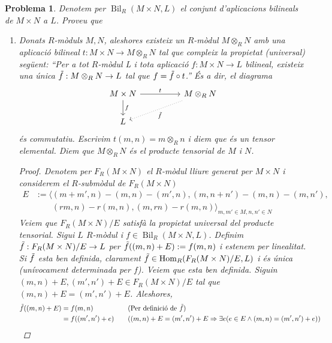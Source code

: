 \documentclass[compress]{article}
\newtheorem{problema}{Problema}
\theoremstyle{definition}
\DeclareMathOperator{\Hom}{Hom}
\DeclareMathOperator{\Bil}{Bil}
\begin{document}
\begin{problema}
    Denotem per $\Bil_{R}(M\times N,L)$ el conjunt d'aplicacions bilineals de $M\times N$ a $L$. Proveu que
    \begin{enumerate}
        \item Donats $R$-mòduls $M,N$, aleshores existeix un $R$-mòdul $M\otimes_{R}N$ amb una aplicació bilineal $t:M\times N\rightarrow M\otimes_{R}N$ tal que compleix la propietat (universal) següent: “Per a tot $R$-mòdul L i tota aplicació $f:M\times N\rightarrow L$ bilineal, existeix una única $\Tilde{f}:M\otimes_{R}N\rightarrow L$ tal que $f=\Tilde{f}\circ t$.” És a dir, el diagrama
        \begin{equation*}
        \begin{tikzcd}
            M\times N
            \arrow{rr}{t}
            \arrow{d}{f}
            &&M\otimes_{R}N
            \arrow[dotted]{dll}{\Tilde{f}}\\
            L
        \end{tikzcd}
        \end{equation*}
        és commutatiu. Escrivim $t(m,n)=m\otimes_{R}n$ i diem que és un tensor elemental. Diem que $M\otimes_{R}N$ és el producte tensorial de $M$ i $N$.
        \begin{proof}
            Denotem per $F_{R}(M\times N)$ el $R$-mòdul lliure generat per $M\times N$ i considerem el $R$-submòdul de $F_{R}(M\times N)$
            \begin{align*}
                E&:=\langle(m+m',n)-(m,n)-(m',n),(m,n+n')-(m,n)-(m,n'),\\
                &\,\,\,\,\,\,\,\,\,\,\,\,(rm,n)-r(m,n),(m,rn)-r(m,n)\rangle_{m,m'\in M,n,n'\in N}
            \end{align*}
            Veiem que $F_{R}(M\times N)/E$ satisfà la propietat universal del producte tensorial. Sigui $L$ $R$-mòdul i $f\in\Bil_{R}(M\times N,L)$. Definim $\Tilde{f}:F_{R}(M\times N)/E\rightarrow L$ per $\Tilde{f}((m,n)+E):=f(m,n)$ i estenem per linealitat. Si $\Tilde{f}$ esta ben definida, clarament $\Tilde{f}\in\Hom_{R}(F_{R}(M\times N)/E,L)$ i és única (unívocament determinada per $f$). Veiem que esta ben definida. Siguin $(m,n)+E,(m',n')+E\in F_{R}(M\times N)/E$ tal que $(m,n)+E=(m',n')+E$. Aleshores,
            \begin{align*}
                \Tilde{f}((m,n)+E)
                &=f(m,n)
                &\quad&\textrm{(Per definició de $\Tilde{f}$)}\\
                &=f((m',n')+e)
                &\quad&\textrm{($(m,n)+E=(m',n')+E\Rightarrow\exists e(e\in E\land (m,n)=(m',n')+e)$)}\\

\end{align*}
\end{proof}
\end{enumerate}
\end{problema}
\end{document}

